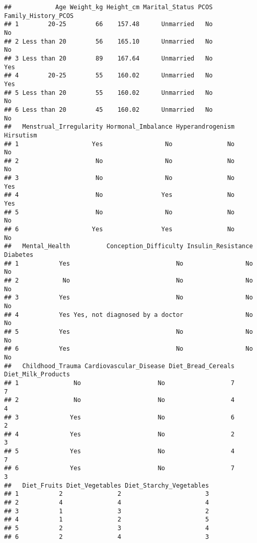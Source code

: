 \documentclass[
]{article}
\begin{document}
\begin{verbatim}
##            Age Weight_kg Height_cm Marital_Status PCOS Family_History_PCOS
## 1        20-25        66    157.48      Unmarried   No                  No
## 2 Less than 20        56    165.10      Unmarried   No                  No
## 3 Less than 20        89    167.64      Unmarried   No                 Yes
## 4        20-25        55    160.02      Unmarried   No                 Yes
## 5 Less than 20        55    160.02      Unmarried   No                  No
## 6 Less than 20        45    160.02      Unmarried   No                  No
##   Menstrual_Irregularity Hormonal_Imbalance Hyperandrogenism Hirsutism
## 1                    Yes                 No               No        No
## 2                     No                 No               No        No
## 3                     No                 No               No       Yes
## 4                     No                Yes               No       Yes
## 5                     No                 No               No        No
## 6                    Yes                Yes               No        No
##   Mental_Health          Conception_Difficulty Insulin_Resistance Diabetes
## 1           Yes                             No                 No       No
## 2            No                             No                 No       No
## 3           Yes                             No                 No       No
## 4           Yes Yes, not diagnosed by a doctor                 No       No
## 5           Yes                             No                 No       No
## 6           Yes                             No                 No       No
##   Childhood_Trauma Cardiovascular_Disease Diet_Bread_Cereals Diet_Milk_Products
## 1               No                     No                  7                  7
## 2               No                     No                  4                  4
## 3              Yes                     No                  6                  2
## 4              Yes                     No                  2                  3
## 5              Yes                     No                  4                  7
## 6              Yes                     No                  7                  3
##   Diet_Fruits Diet_Vegetables Diet_Starchy_Vegetables
## 1           2               2                       3
## 2           4               4                       4
## 3           1               3                       2
## 4           1               2                       5
## 5           2               3                       4
## 6           2               4                       3

\end{verbatim}
\end{document}
